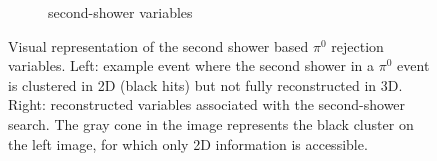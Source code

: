 \begin{figure}[H]
\begin{center}
\begin{subfigure}[b]{0.27\textwidth}
    \caption{\label{fig:nue:variables:secondshower}second-shower variables }
    \end{subfigure}
\caption{\label{fig:nue:variables:secondshower} Visual representation of the second shower based $\pi^0$ rejection variables. Left: example event where the second shower in a $\pi^0$ event is clustered in 2D (black hits) but not fully reconstructed in 3D. Right: reconstructed variables associated with the second-shower search. The gray cone in the image represents the black cluster on the left image, for which only 2D information is accessible.}
\end{center}
\end{figure}



